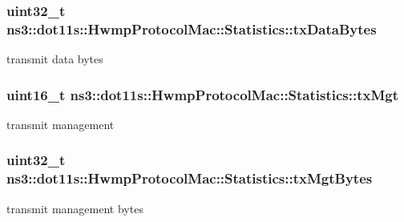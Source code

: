 \subsubsection[{\texorpdfstring{tx\+Data\+Bytes}{txDataBytes}}]{\setlength{\rightskip}{0pt plus 5cm}uint32\+\_\+t ns3\+::dot11s\+::\+Hwmp\+Protocol\+Mac\+::\+Statistics\+::tx\+Data\+Bytes}\hypertarget{structns3_1_1dot11s_1_1HwmpProtocolMac_1_1Statistics_a50db26efb7b9d224d4c803000a31ae39}{}\label{structns3_1_1dot11s_1_1HwmpProtocolMac_1_1Statistics_a50db26efb7b9d224d4c803000a31ae39}


transmit data bytes 

\subsubsection[{\texorpdfstring{tx\+Mgt}{txMgt}}]{\setlength{\rightskip}{0pt plus 5cm}uint16\+\_\+t ns3\+::dot11s\+::\+Hwmp\+Protocol\+Mac\+::\+Statistics\+::tx\+Mgt}\hypertarget{structns3_1_1dot11s_1_1HwmpProtocolMac_1_1Statistics_a78612a24d8373449a33e403bd30fab04}{}\label{structns3_1_1dot11s_1_1HwmpProtocolMac_1_1Statistics_a78612a24d8373449a33e403bd30fab04}


transmit management 

\subsubsection[{\texorpdfstring{tx\+Mgt\+Bytes}{txMgtBytes}}]{\setlength{\rightskip}{0pt plus 5cm}uint32\+\_\+t ns3\+::dot11s\+::\+Hwmp\+Protocol\+Mac\+::\+Statistics\+::tx\+Mgt\+Bytes}\hypertarget{structns3_1_1dot11s_1_1HwmpProtocolMac_1_1Statistics_a00b3e08551613bc05de3890e009db1cb}{}\label{structns3_1_1dot11s_1_1HwmpProtocolMac_1_1Statistics_a00b3e08551613bc05de3890e009db1cb}


transmit management bytes 

